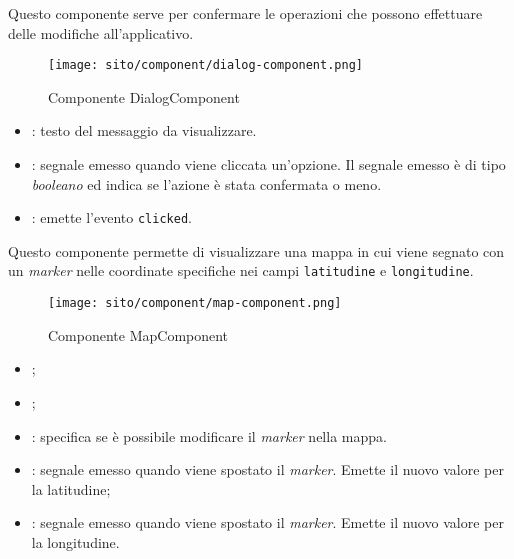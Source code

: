 \label{par:Dialog}
Questo componente serve per confermare le operazioni che possono effettuare delle modifiche all'applicativo.

\begin{figure}[H] 
    \centering 
    \texttt{[image: sito/component/dialog-component.png]} 
    \caption{Componente DialogComponent}
\end{figure}

\begin{itemize}
    \item {}: testo del messaggio da visualizzare.
\end{itemize}

\begin{itemize}
    \item {}: segnale emesso quando viene cliccata un'opzione. Il segnale emesso è di tipo \textit{booleano} ed indica se l'azione è stata confermata o meno. 
\end{itemize}

\begin{itemize}
    \item {}: emette l'evento \texttt{clicked}. 
\end{itemize}


\label{par:MapComponent}
Questo componente permette di visualizzare una mappa in cui viene segnato con un \textit{marker} nelle coordinate specifiche nei campi \texttt{latitudine} e \texttt{longitudine}.
\begin{figure}[H] 
    \centerline{\texttt{[image: sito/component/map-component.png]}} 
    \caption{Componente MapComponent}
\end{figure}

\begin{itemize}
    \item {};
    \item {};
    \item {}: specifica se è possibile modificare il \textit{marker} nella mappa.
\end{itemize}

\begin{itemize}
    \item {}: segnale emesso quando viene spostato il \textit{marker}. Emette il nuovo valore per la latitudine; 
    \item {}: segnale emesso quando viene spostato il \textit{marker}. Emette il nuovo valore per la longitudine.
\end{itemize}

